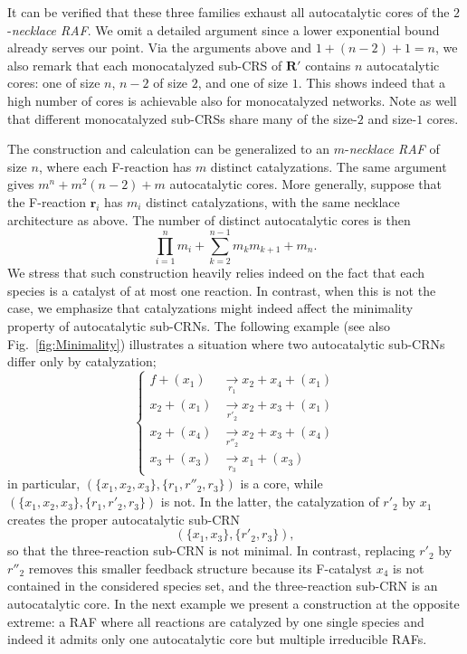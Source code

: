 \documentclass[pdflatex]{sn-jnl}
\theoremstyle{thmstyleone}%
\theoremstyle{examplesty}%
\theoremstyle{thmstylethree}%
\newcommand{\fr}[0]{\mathbf{r}}
\newcommand{\RAF}[0]{\mathbf{R}'}
\begin{document}
It can be verified that these three families exhaust all autocatalytic cores of the
$2$-\emph{necklace RAF}. We omit a detailed argument since a lower exponential bound already serves our point. Via the arguments above and $
  1+(n-2)+1=n$, we also remark that each monocatalyzed sub-CRS of $\RAF$ contains $n$ 
autocatalytic cores: one of size $n$, $n-2$ of size $2$, and one of
size $1$. This shows indeed that a high number of cores is achievable also for monocatalyzed networks. Note as well that different monocatalyzed sub-CRSs share many of the
size-$2$ and size-$1$ cores.

The construction and calculation can be generalized to an
$m$-\emph{necklace RAF} of size $n$, where each F-reaction has $m$
distinct catalyzations. The same argument gives
  $m^n+m^2(n-2)+m$
autocatalytic cores. More generally, suppose that the F-reaction $\fr_i$ has $m_i$ distinct
catalyzations, with the same necklace architecture as above. The number
of distinct autocatalytic cores is then
\begin{equation}
  \prod_{i=1}^{n}m_i
  +
  \sum_{k=2}^{n-1}m_km_{k+1}
  +
  m_n.
\end{equation}
We stress that such construction heavily relies indeed on the fact that each
species is a catalyst of at most one reaction. In contrast, when this is
not the case, we emphasize that catalyzations might indeed affect
the minimality property of autocatalytic sub-CRNs. 
The following example (see also Fig.~\ref{fig:Minimality}) illustrates a situation where two
autocatalytic sub-CRNs differ only by catalyzation;
\begin{equation}\label{eq:MinCat}
  \begin{cases}
    f + (x_1) &
    \underset{r_1}{\rightarrow} x_2 + x_4 + (x_1) \\[0.5em]
    x_2 + (x_1) &
    \underset{r'_2}{\rightarrow} x_2 + x_3 + (x_1) \\[0.5em]
    x_2 + (x_4) &
    \underset{r''_2}{\rightarrow} x_2 + x_3 + (x_4) \\[0.5em]
    x_3 + (x_3) &
    \underset{r_3}{\rightarrow} x_1 + (x_3)
  \end{cases}
\end{equation}
in particular, $
  (\{x_1,x_2,x_3\},\{r_1,r''_2,r_3\})$
is a core, while 
$
  (\{x_1,x_2,x_3\},\{r_1,r'_2,r_3\})
$
is not. In the latter, the catalyzation of $r'_2$ by
$x_1$ creates the proper autocatalytic sub-CRN
\[
  (\{x_1,x_3\},\{r'_2,r_3\}),
\]
so that the three-reaction sub-CRN is not minimal. In contrast, replacing
$r'_2$ by $r''_2$ removes this smaller feedback structure because its
F-catalyst $x_4$ is not contained in the considered species set, and the
three-reaction sub-CRN is an autocatalytic core. In the next example we 
present a construction at the opposite extreme: a RAF where all reactions 
are catalyzed by one single species and indeed it admits only one autocatalytic 
core but multiple irreducible RAFs.
\end{document}
